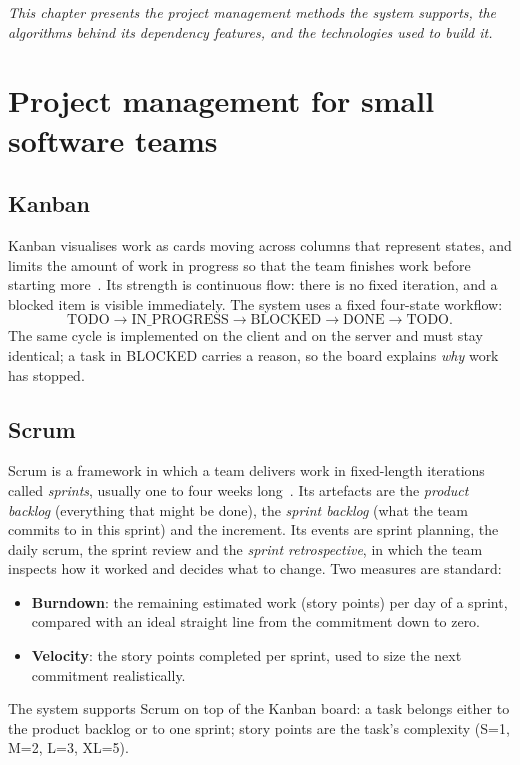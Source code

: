 \documentclass[../main.tex]{subfiles}
\begin{document}
\textit{This chapter presents the project management methods the system supports, the algorithms
behind its dependency features, and the technologies used to build it.}

\section{Project management for small software teams}
\subsection{Kanban}
Kanban visualises work as cards moving across columns that represent states, and limits the amount
of work in progress so that the team finishes work before starting more~\cite{anderson2010kanban}.
Its strength is continuous flow: there is no fixed iteration, and a blocked item is visible
immediately. The system uses a fixed four-state workflow:
\[
\text{TODO} \rightarrow \text{IN\_PROGRESS} \rightarrow \text{BLOCKED} \rightarrow \text{DONE} \rightarrow \text{TODO}.
\]
The same cycle is implemented on the client and on the server and must stay identical; a task in
BLOCKED carries a reason, so the board explains \emph{why} work has stopped.

\subsection{Scrum}
Scrum is a framework in which a team delivers work in fixed-length iterations called
\emph{sprints}, usually one to four weeks long~\cite{schwaber2020scrum}. Its artefacts are the
\emph{product backlog} (everything that might be done), the \emph{sprint backlog} (what the team
commits to in this sprint) and the increment. Its events are sprint planning, the daily scrum, the
sprint review and the \emph{sprint retrospective}, in which the team inspects how it worked and
decides what to change. Two measures are standard:
\begin{itemize}
  \item \textbf{Burndown}: the remaining estimated work (story points) per day of a sprint,
        compared with an ideal straight line from the commitment down to zero.
  \item \textbf{Velocity}: the story points completed per sprint, used to size the next
        commitment realistically.
\end{itemize}
The system supports Scrum on top of the Kanban board: a task belongs either to the product backlog or to
one sprint; story points are the task's complexity (S=1, M=2, L=3, XL=5).
\end{document}
